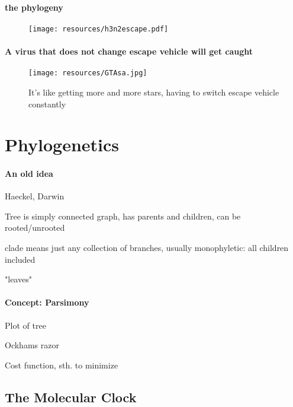 \documentclass{beamer}
\begin{document}
\begin{darkframes}
    \begin{frame}{\secname}
      \framesubtitle{the phylogeny}
      \begin{figure}
        \texttt{[image: resources/h3n2escape.pdf]}
        \caption{\footnotesize }
      \end{figure}
    \end{frame}

    \begin{frame}{\secname}
      \framesubtitle{A virus that does not change escape vehicle will get caught}
      \begin{figure}
        \texttt{[image: resources/GTAsa.jpg]}
        \caption{\footnotesize It's like getting more and more stars, having to switch escape vehicle constantly}
      \end{figure}
    \end{frame}







  \section{Phylogenetics}

    \begin{frame}{\secname}
      \framesubtitle{An old idea}
      Haeckel, Darwin

      Tree is simply connected graph, has parents and children, can be rooted/unrooted

      clade means just any collection of branches, usually monophyletic: all children included

      "leaves"
    \end{frame}



    \begin{frame}{\secname}

      \framesubtitle{Concept: Parsimony}

      Plot of tree

      Ockhams razor

      Cost function, sth. to minimize

    \end{frame}

    \subsection{The Molecular Clock}


\end{darkframes}
\end{document}
